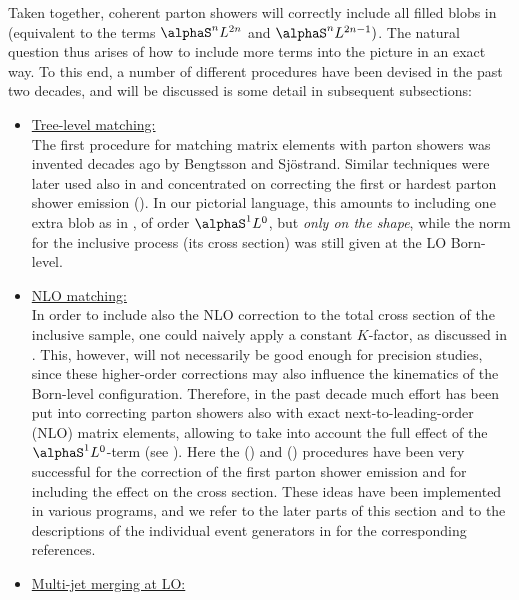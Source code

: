 Taken together, coherent parton showers will correctly include all
filled blobs in  (equivalent to the
terms $\alphaS^nL^{2n}$ and $\alphaS^nL^{2n-1})$.  The natural
question thus arises of how to include more terms into the picture in
an exact way.  To this end, a number of different procedures have been
devised in the past two decades, and will be discussed is some detail
in subsequent subsections:
\begin{itemize}
\item \underline{Tree-level matching:}\\
  The first procedure for matching matrix elements with parton showers
  was invented decades ago by Bengtsson and
  Sjöstrand\cite{Bengtsson:1986hr}.  Similar techniques were later
  used also in
  \cite{Gustafson:1987rq,Seymour:1994we,Seymour:1994df,Miu:1998ju,Lonnblad:1995ex}
  and concentrated on correcting the first or hardest parton shower
  emission ().  In our pictorial
  language, this amounts to including one extra blob as in
  , of order $\alphaS^1 L^0$, but
  \emph{only on the shape}, while the norm for the inclusive process (its
  cross section) was still given at the LO Born-level.
\item \underline{NLO matching:}\\
  In order to include also the NLO correction to the total cross
  section of the inclusive sample, one could naively apply a constant
  $K$-factor, as discussed in
  .  This, however, will
  not necessarily be good enough for precision studies, since these
  higher-order corrections may also influence the kinematics of the
  Born-level configuration.  Therefore, in the past decade much effort
  has been put into correcting parton showers also with exact
  next-to-leading-order (NLO) matrix elements, allowing to take into
  account the full effect of the $\alphaS^1 L^0$-term (see
  ).  Here the
  \MCatNLO\cite{Frixione:2002ik,Frixione:2006gn}
  () and \POWHEG\cite{Nason:2004rx}
  () procedures have been very successful for the
  correction of the first parton shower emission and for including the
  effect on the cross section.  These ideas have been implemented in
  various programs, and we refer to the later parts of this section
  and to the descriptions of the individual event generators in
   for the corresponding references.
\item \underline{Multi-jet merging at LO:}\\

\end{itemize}
